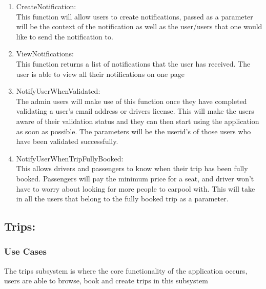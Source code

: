 \documentclass[hidelinks, 12pt, a4paper]{article}
\begin{document}
\begin{enumerate}[label=U1.\arabic*]

      \item CreateNotification:\\
            This function will allow users to create notifications, passed as a parameter will be the context of the notification as well as the user/users that one would like to send the notification to.\\

      \item ViewNotifications:\\
            This function returns a list of notifications that the user has received. The user is able to view all their notifications on one page\\

      \item NotifyUserWhenValidated:\\
            The admin users will make use of this function once they have completed validating a user’s email address or drivers license. This will make the users aware of their validation status and they can then start using the application as soon as possible. The parameters will be the userid’s of those users who have been validated successfully.\\

      \item NotifyUserWhenTripFullyBooked: \\
            This allows drivers and passengers to know when their trip has been fully booked. Passengers will pay the minimum price for a seat, and driver won’t have to worry about looking for more people to carpool with. This will take in all the users that belong to the fully booked trip as a parameter.\\

\end{enumerate}
\newpage
\subsection{Trips:}
\subsubsection{Use Cases}
The trips subsystem is where the core functionality of the application occurs, users are able to browse, book and create trips in this subsystem
\end{document}
